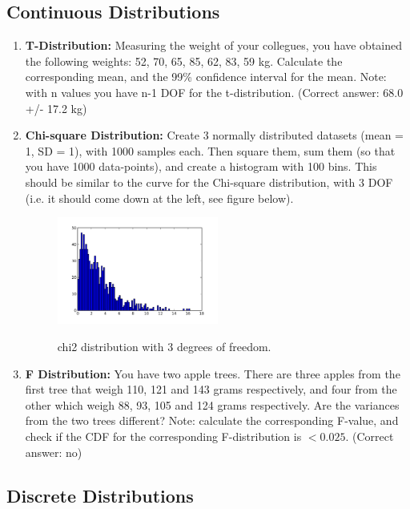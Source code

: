 \subsection{Continuous Distributions }
\begin{enumerate}
    \item \textbf{T-Distribution:} Measuring the weight of your collegues, you have obtained the following weights: 52, 70, 65, 85, 62, 83, 59 kg.
    Calculate the corresponding mean, and the 99\% confidence interval for the mean. Note: with n values you have n-1 DOF for the t-distribution.
    (Correct answer: 68.0 +/- 17.2 kg)

    \item \textbf{Chi-square Distribution:} Create 3 normally distributed datasets (mean = 1, SD = 1), with 1000 samples each. Then square them, sum them (so that you have 1000 data-points), and create a histogram with 100 bins. This should be similar to the curve for the Chi-square distribution, with 3 DOF (i.e. it should come down at the left, see figure below).
    \begin{figure}
      \centering
      \includegraphics[width=0.5\textwidth]{../Images/chi2_3dof.png}\\
      \caption{chi2 distribution with 3 degrees of freedom.}\label{fig:chi23dof}
    \end{figure}

    \item \textbf{F Distribution:} You have two apple trees. There are three apples from the first tree that weigh 110, 121 and 143 grams respectively, and four from the other which weigh 88, 93, 105 and 124 grams respectively. Are the variances from the two trees different?
    Note: calculate the corresponding F-value, and check if the CDF for the corresponding F-distribution is $<0.025$.
    (Correct answer: no)
\end{enumerate}
\subsection{Discrete Distributions }

